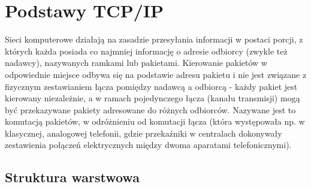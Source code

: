 % 
% 
% 
% 

\section{Podstawy TCP/IP}

Sieci komputerowe działają na zasadzie przesyłania informacji w postaci porcji, z których każda posiada co najmniej informację o adresie odbiorcy (zwykle też nadawcy), nazywanych ramkami lub pakietami. Kierowanie pakietów w odpowiednie miejsce odbywa się na podstawie adresu pakietu i nie jest związane z fizycznym zestawianiem łącza pomiędzy nadawcą a odbiorcą - każdy pakiet jest kierowany niezależnie, a w ramach pojedynczego łącza (kanału transmisji) mogą być przekazywane pakiety adresowane do różnych odbiorców. Nazywane jest to komutacją pakietów, w odróżnieniu od komutacji łącza (która występowała np. w klasycznej, analogowej telefonii, gdzie przekaźniki w centralach dokonywały zestawienia połączeń elektrycznych między dwoma aparatami telefonicznymi).

\subsection{Struktura warstwowa}

